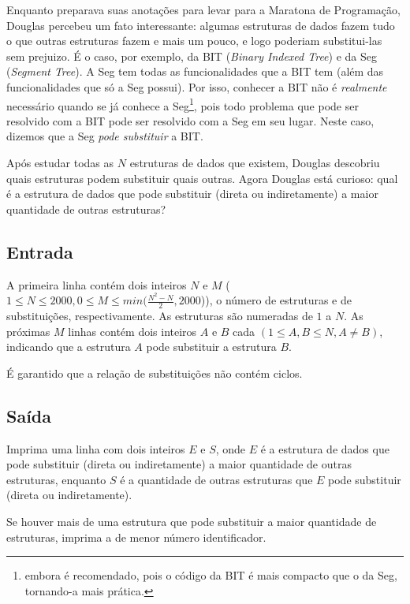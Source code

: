 Enquanto preparava suas anotações para levar para a Maratona de Programação,
Douglas percebeu um fato interessante: algumas estruturas de dados fazem tudo o
que outras estruturas fazem e mais um pouco, e logo poderiam substitui-las sem
prejuizo. É o caso, por exemplo, da BIT (\textit{Binary Indexed Tree}) e da Seg
(\textit{Segment Tree}). A Seg tem todas as funcionalidades que a BIT tem (além
        das funcionalidades que só a Seg possui). Por isso, conhecer a
BIT não é \textit{realmente} necessário quando se já conhece a Seg\footnote{embora é recomendado, pois o
código da BIT é mais compacto que o da Seg, tornando-a mais prática.}, pois todo problema que pode
ser resolvido com a BIT pode ser resolvido com a Seg em seu lugar. Neste caso,
    dizemos que a Seg \textit{pode substituir} a BIT.

Após estudar todas as $N$ estruturas de dados que existem, Douglas descobriu quais
estruturas podem substituir quais outras. Agora Douglas está curioso: qual é a estrutura
de dados que pode substituir (direta ou indiretamente) a maior quantidade de outras estruturas?

\subsection*{Entrada}

A primeira linha contém dois inteiros $N$ e $M$
($1 \leq N \leq 2000, 0 \leq M \leq min(\frac{N^2 - N}{2}, 2000$)), o número de estruturas e de substituições,
respectivamente. As estruturas são numeradas de $1$ a $N$.
As próximas $M$ linhas contém dois inteiros $A$ e $B$ cada
$(1 \leq A, B \leq N, A \neq B)$, indicando que a estrutura $A$ pode substituir a
estrutura $B$.

É garantido que a relação de substituições não contém ciclos.

\subsection*{Saída}

Imprima uma linha com dois inteiros $E$ e $S$, onde $E$ é a estrutura de dados
que pode substituir (direta ou indiretamente) a maior quantidade de outras estruturas, enquanto $S$ é a quantidade
de outras estruturas que $E$ pode substituir (direta ou indiretamente).

Se houver mais de uma estrutura que pode substituir a maior quantidade de estruturas,
imprima a de menor número identificador.

